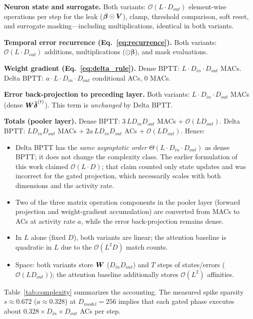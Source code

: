 \documentclass[10pt,journal,compsoc]{IEEEtran}
\begin{document}
\textbf{Neuron state and surrogate.} Both variants: $\mathcal{O}(L \cdot D_{out})$ element-wise operations per step for the leak ($\boldsymbol{\beta}\odot\boldsymbol{V}$), clamp, threshold comparison, soft reset, and surrogate masking---including multiplications, identical in both variants.

\textbf{Temporal error recurrence (Eq.~\ref{eq:recurrence}).} Both variants: $\mathcal{O}(L \cdot D_{out})$ additions, multiplications ($\odot\bm{\beta}$), and mask evaluations.

\textbf{Weight gradient (Eq.~\ref{eq:delta_rule}).} Dense BPTT: $L \cdot D_{in} \cdot D_{out}$ MACs. Delta BPTT: $a \cdot L \cdot D_{in} \cdot D_{out}$ conditional ACs, $0$ MACs.

\textbf{Error back-projection to preceding layer.} Both variants: $L \cdot D_{in} \cdot D_{out}$ MACs (dense $\boldsymbol{W}\tilde{\boldsymbol{\delta}}^{(t)}$). This term is \emph{unchanged} by Delta BPTT.

\medskip
\noindent\textbf{Totals (pooler layer).} Dense BPTT: $3\,L D_{in} D_{out}$ MACs $+\; \mathcal{O}(L D_{out})$. Delta BPTT: $L D_{in} D_{out}$ MACs $+\; 2a\,L D_{in} D_{out}$ ACs $+\; \mathcal{O}(L D_{out})$. Hence:
\begin{itemize}
    \item Delta BPTT has the \emph{same asymptotic order} $\Theta(L \cdot D_{in} \cdot D_{out})$ as dense BPTT; it does not change the complexity class. The earlier formulation of this work claimed $\mathcal{O}(L\cdot D)$; that claim counted only state updates and was incorrect for the gated projection, which necessarily scales with both dimensions and the activity rate.
    \item Two of the three matrix operation components in the pooler layer (forward projection and weight-gradient accumulation) are converted from MACs to ACs at activity rate $a$, while the error back-projection remains dense.
    \item In $L$ alone (fixed $D$), both variants are linear; the attention baseline is quadratic in $L$ due to the $\mathcal{O}(L^2 D)$ match counts.
    \item Space: both variants store $\boldsymbol{W}$ ($D_{in}D_{out}$) and $T$ steps of states/errors ($\mathcal{O}(L D_{out})$); the attention baseline additionally stores $\mathcal{O}(L^2)$ affinities.
\end{itemize}
Table~\ref{tab:complexity} summarizes the accounting. The measured spike sparsity $s \approx 0.672$ ($a \approx 0.328$) at $D_{model}=256$ implies that each gated phase executes about $0.328 \times D_{in} \times D_{out}$ ACs per step.
\end{document}
